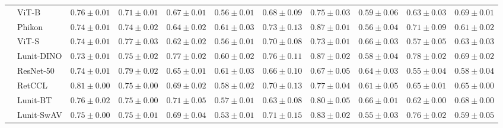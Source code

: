 \begin{tabular}{ll|cccc|c|cccc}
 & ViT-B & $0.76 \pm 0.01$ & $0.71 \pm 0.01$ & $0.67 \pm 0.01$ & $0.56 \pm 0.01$ & $0.68 \pm 0.09$ & $0.75 \pm 0.03$ & $0.59 \pm 0.06$ & $0.63 \pm 0.03$ & $\mathbf{0.69 \pm 0.01}$ \\
 & Phikon & $0.74 \pm 0.01$ & $0.74 \pm 0.02$ & $0.64 \pm 0.02$ & $0.61 \pm 0.03$ & $0.73 \pm 0.13$ & $\mathbf{0.87 \pm 0.01}$ & $0.56 \pm 0.04$ & $0.71 \pm 0.09$ & $0.61 \pm 0.02$ \\
 & ViT-S & $0.74 \pm 0.01$ & $0.77 \pm 0.03$ & $0.62 \pm 0.02$ & $0.56 \pm 0.01$ & $0.70 \pm 0.08$ & $0.73 \pm 0.01$ & $\mathbf{0.66 \pm 0.03}$ & $0.57 \pm 0.05$ & $0.63 \pm 0.03$ \\
 & Lunit-DINO & $0.73 \pm 0.01$ & $0.75 \pm 0.02$ & $\mathbf{0.77 \pm 0.02}$ & $0.60 \pm 0.02$ & $\mathbf{0.76 \pm 0.11}$ & $0.87 \pm 0.02$ & $0.58 \pm 0.04$ & $\mathbf{0.78 \pm 0.02}$ & $0.69 \pm 0.02$ \\
 & ResNet-50 & $0.74 \pm 0.01$ & $\mathbf{0.79 \pm 0.02}$ & $0.65 \pm 0.01$ & $0.61 \pm 0.03$ & $0.66 \pm 0.10$ & $0.67 \pm 0.05$ & $0.64 \pm 0.03$ & $0.55 \pm 0.04$ & $0.58 \pm 0.04$ \\
 & RetCCL & $0.81 \pm 0.00$ & $0.75 \pm 0.00$ & $0.69 \pm 0.02$ & $0.58 \pm 0.02$ & $0.70 \pm 0.13$ & $0.77 \pm 0.04$ & $0.61 \pm 0.05$ & $0.65 \pm 0.01$ & $0.65 \pm 0.00$ \\
 & Lunit-BT & $0.76 \pm 0.02$ & $0.75 \pm 0.00$ & $0.71 \pm 0.05$ & $0.57 \pm 0.01$ & $0.63 \pm 0.08$ & $0.80 \pm 0.05$ & $0.66 \pm 0.01$ & $0.62 \pm 0.00$ & $0.68 \pm 0.00$ \\
 & Lunit-SwAV & $0.75 \pm 0.00$ & $0.75 \pm 0.01$ & $0.69 \pm 0.04$ & $0.53 \pm 0.01$ & $0.71 \pm 0.15$ & $0.83 \pm 0.02$ & $0.55 \pm 0.03$ & $0.76 \pm 0.02$ & $0.59 \pm 0.05$ \\
\cline{1-11}
\bottomrule
\end{tabular}
